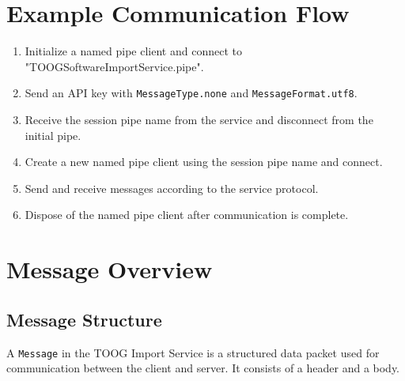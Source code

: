 \documentclass{memoir}
\begin{document}
	\section{Example Communication Flow}
	\begin{enumerate}
		\item Initialize a named pipe client and connect to "TOOGSoftwareImportService.pipe".
		\item Send an API key with \texttt{MessageType.none} and \texttt{MessageFormat.utf8}.
		\item Receive the session pipe name from the service and disconnect from the initial pipe.
		\item Create a new named pipe client using the session pipe name and connect.
		\item Send and receive messages according to the service protocol.
		\item Dispose of the named pipe client after communication is complete.
	\end{enumerate}
	
	\section{Message Overview}
	
	\subsection{Message Structure}
	A \texttt{Message} in the TOOG Import Service is a structured data packet used for communication between the client and server. It consists of a header and a body.
	
\end{document}
